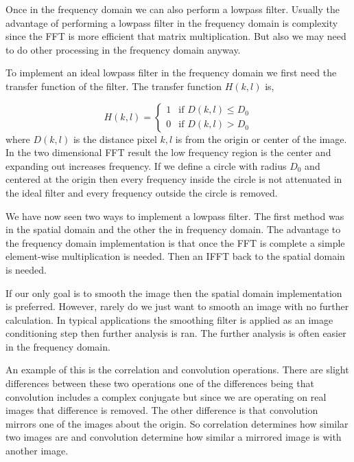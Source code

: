 Once in the frequency domain we can also perform a lowpass filter. Usually the advantage of performing a lowpass filter in the frequency domain is complexity since the \ac{FFT} is more efficient that matrix multiplication. But also we may need to do other processing in the frequency domain anyway. 

To implement an ideal lowpass filter in the frequency domain we first need the transfer function of the filter. The transfer function $H(k,l)$ is,

\begin{equation}
H(k,l) = 
\begin{cases}
1 & \text{if $D(k,l) \leq D_0$}\\
0 & \text{if $D(k,l) > D_0$}
\end{cases}
\end{equation}
\noindent
where $D(k,l)$ is the distance pixel $k,l$ is from the origin or center of the image. In the two dimensional \ac{FFT} result the low frequency region is the center and expanding out increases frequency. If we define a circle with radius $D_0$ and centered at the origin then every frequency inside the circle is not attenuated in the ideal filter and every frequency outside the circle is removed. 

We have now seen two ways to implement a lowpass filter. The first method was in the spatial domain and the other the in frequency domain. The advantage to the frequency domain implementation is that once the \ac{FFT} is complete a simple element-wise multiplication is needed. Then an \ac{IFFT} back to the spatial domain is needed. 

If our only goal is to smooth the image then the spatial domain implementation is preferred. However, rarely do we just want to smooth an image with no further calculation. In typical applications the smoothing filter is applied as an image conditioning step then further analysis is ran. The further analysis is often easier in the frequency domain.

An example of this is the correlation and convolution operations. There are slight differences between these two operations one of the differences being that convolution includes a complex conjugate but since we are operating on real images that difference is removed. The other difference is that convolution mirrors one of the images about the origin. So correlation determines how similar two images are and convolution determine how similar a mirrored image is with another image. 

